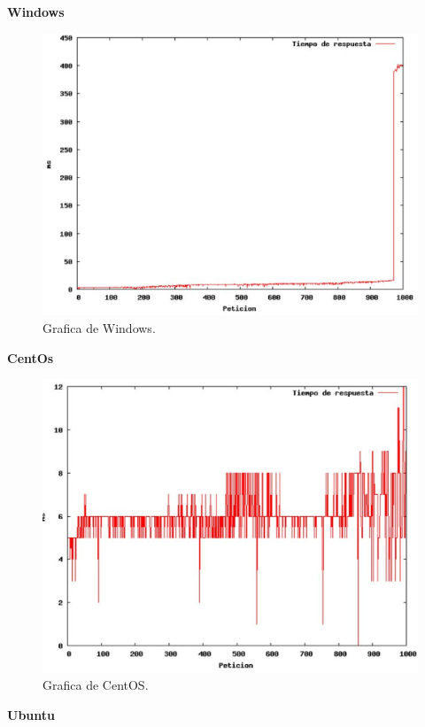 \textbf{Windows}
\begin{figure}[H]
\begin{center}
\includegraphics[scale=0.3]{imagenes/imagen3-1.eps}
\caption{Grafica de Windows.}
\end{center}
\end{figure}
\textbf{CentOs} 
\begin{figure}[H]
\begin{center}
\includegraphics[scale=0.3]{imagenes/imagen3-2.eps}
\caption{Grafica de CentOS.}
\end{center}
\end{figure}
\textbf{Ubuntu}
